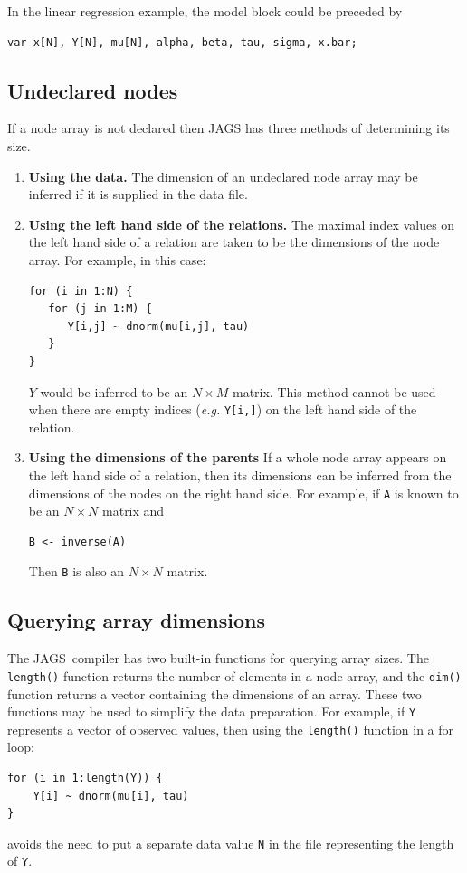 \documentclass[11pt, a4paper, titlepage]{report}
\newcommand{\JAGS}{\textsf{JAGS}}
\begin{document}
In the linear regression example, the model block could be preceded by
\begin{verbatim}
var x[N], Y[N], mu[N], alpha, beta, tau, sigma, x.bar;
\end{verbatim}

\subsection{Undeclared nodes}

If a node array is not declared then JAGS has three methods of
determining its size.
\begin{enumerate}
\item {\bf Using the data.}  The dimension of an undeclared node array
  may be inferred if it is supplied in the data file.
\item {\bf Using the left hand side of the relations.}  The maximal
  index values on the left hand side of a relation are taken to be the
  dimensions of the node array.  For example, in this case:
\begin{verbatim}
for (i in 1:N) {
   for (j in 1:M) {
      Y[i,j] ~ dnorm(mu[i,j], tau)
   }
}
\end{verbatim}
$Y$ would be inferred to be an $N \times M$ matrix. This method cannot 
be used when there are empty indices ({\em e.g.} \verb+Y[i,]+) on the left
hand side of the relation.
\item {\bf Using the dimensions of the parents} If a whole node array
  appears on the left hand side of a relation, then its dimensions can
  be inferred from the dimensions of the nodes on the right hand side.
  For example, if \verb+A+ is known to be an $N \times N$ matrix
  and
\begin{verbatim}
B <- inverse(A)
\end{verbatim}
Then \verb+B+ is also an $N \times N$ matrix.
\end{enumerate}

\subsection{Querying array dimensions}  

The \JAGS\ compiler has two built-in functions for querying array
sizes.  The \verb+length()+ function returns the number of elements in
a node array, and the \verb+dim()+ function returns a vector
containing the dimensions of an array.  These two functions may be
used to simplify the data preparation. For example, if \verb+Y+
represents a vector of observed values, then using the \verb+length()+
function in a for loop:
\begin{verbatim}
for (i in 1:length(Y)) {
    Y[i] ~ dnorm(mu[i], tau)
}
\end{verbatim}
avoids the need to put a separate data value \verb+N+ in the file
representing the length of \verb+Y+.  
\end{document}
